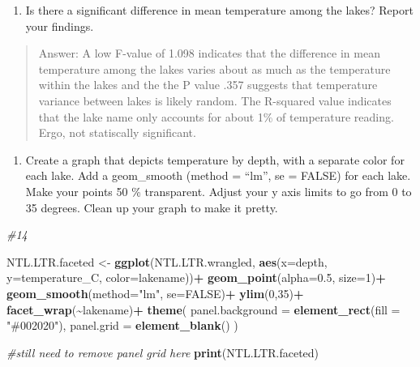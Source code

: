 \documentclass[
]{article}
\newenvironment{Shaded}{\begin{snugshade}}{\end{snugshade}}
\newcommand{\AttributeTok}[1]{\textcolor[rgb]{0.13,0.29,0.53}{#1}}
\newcommand{\CommentTok}[1]{\textcolor[rgb]{0.56,0.35,0.01}{\textit{#1}}}
\newcommand{\ConstantTok}[1]{\textcolor[rgb]{0.56,0.35,0.01}{#1}}
\newcommand{\DecValTok}[1]{\textcolor[rgb]{0.00,0.00,0.81}{#1}}
\newcommand{\FloatTok}[1]{\textcolor[rgb]{0.00,0.00,0.81}{#1}}
\newcommand{\FunctionTok}[1]{\textcolor[rgb]{0.13,0.29,0.53}{\textbf{#1}}}
\newcommand{\NormalTok}[1]{#1}
\newcommand{\OtherTok}[1]{\textcolor[rgb]{0.56,0.35,0.01}{#1}}
\newcommand{\SpecialCharTok}[1]{\textcolor[rgb]{0.81,0.36,0.00}{\textbf{#1}}}
\newcommand{\StringTok}[1]{\textcolor[rgb]{0.31,0.60,0.02}{#1}}
\providecommand{\tightlist}{%
  \setlength{\itemsep}{0pt}\setlength{\parskip}{0pt}}
\begin{document}
\begin{enumerate}
\def\labelenumi{\arabic{enumi}.}
\setcounter{enumi}{12}
\tightlist
\item
  Is there a significant difference in mean temperature among the lakes?
  Report your findings.
\end{enumerate}

\begin{quote}
Answer: A low F-value of 1.098 indicates that the difference in mean
temperature among the lakes varies about as much as the temperature
within the lakes and the the P value .357 suggests that temperature
variance between lakes is likely random. The R-squared value indicates
that the lake name only accounts for about 1\% of temperature reading.
Ergo, not statiscally significant.
\end{quote}

\begin{enumerate}
\def\labelenumi{\arabic{enumi}.}
\setcounter{enumi}{13}
\tightlist
\item
  Create a graph that depicts temperature by depth, with a separate
  color for each lake. Add a geom\_smooth (method = ``lm'', se = FALSE)
  for each lake. Make your points 50 \% transparent. Adjust your y axis
  limits to go from 0 to 35 degrees. Clean up your graph to make it
  pretty.
\end{enumerate}

\begin{Shaded}
\begin{Highlighting}[]
\CommentTok{\#14}


\NormalTok{NTL.LTR.faceted }\OtherTok{\textless{}{-}} \FunctionTok{ggplot}\NormalTok{(NTL.LTR.wrangled, }\FunctionTok{aes}\NormalTok{(}\AttributeTok{x=}\NormalTok{depth, }\AttributeTok{y=}\NormalTok{temperature\_C, }\AttributeTok{color=}\NormalTok{lakename))}\SpecialCharTok{+}
  \FunctionTok{geom\_point}\NormalTok{(}\AttributeTok{alpha=}\FloatTok{0.5}\NormalTok{, }\AttributeTok{size=}\DecValTok{1}\NormalTok{)}\SpecialCharTok{+} 
  \FunctionTok{geom\_smooth}\NormalTok{(}\AttributeTok{method=}\StringTok{"lm"}\NormalTok{, }\AttributeTok{se=}\ConstantTok{FALSE}\NormalTok{)}\SpecialCharTok{+}
  \FunctionTok{ylim}\NormalTok{(}\DecValTok{0}\NormalTok{,}\DecValTok{35}\NormalTok{)}\SpecialCharTok{+}
  \FunctionTok{facet\_wrap}\NormalTok{(}\SpecialCharTok{\textasciitilde{}}\NormalTok{lakename)}\SpecialCharTok{+}
   \FunctionTok{theme}\NormalTok{(}
    \AttributeTok{panel.background =} \FunctionTok{element\_rect}\NormalTok{(}\AttributeTok{fill =} \StringTok{"\#002020"}\NormalTok{),}
      \AttributeTok{panel.grid =} \FunctionTok{element\_blank}\NormalTok{()}
\NormalTok{   )}

\CommentTok{\#still need to remove panel grid here }
\FunctionTok{print}\NormalTok{(NTL.LTR.faceted) }
\end{Highlighting}
\end{Shaded}
\end{document}
